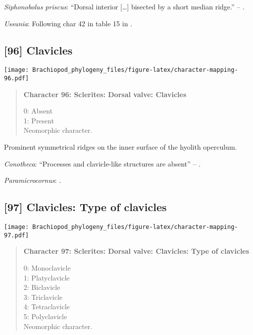 \documentclass[openany]{book}
\theoremstyle{definition}
\theoremstyle{definition}
\theoremstyle{definition}
\theoremstyle{remark}
\begin{document}
\hypertarget{Siphonobolus_priscus-coding-95}{}
\emph{Siphonobolus priscus}: ``Dorsal interior {[}\ldots{}{]} bisected
by a short median ridge.'' -- \citet{Popov2009Earlyontogeny}.

\hypertarget{Ussunia-coding-95}{}
\emph{Ussunia}: Following char 42 in table 15 in
\citet{Williams2000LinguliformeaCraniiformea}.

\subsection*{{[}96{]} Clavicles}\label{clavicles}

\texttt{[image: Brachiopod\_phylogeny\_files/figure-latex/character-mapping-96.pdf]}

\begin{quote}
\textbf{Character 96: Sclerites: Dorsal valve: Clavicles}

0: Absent\\
1: Present\\
Neomorphic character.
\end{quote}

Prominent symmetrical ridges on the inner surface of the hyolith
operculum.

\hypertarget{Conotheca-coding-96}{}
\emph{Conotheca}: ``Processes and clavicle-like structures are absent''
-- \citet{Davaere2014}.

\hypertarget{Paramicrocornus-coding-96}{}
\emph{Paramicrocornus}: \citet{Zhang2018Ahyolithid}.

\subsection*{{[}97{]} Clavicles: Type of
clavicles}\label{clavicles-type-of-clavicles}

\texttt{[image: Brachiopod\_phylogeny\_files/figure-latex/character-mapping-97.pdf]}

\begin{quote}
\textbf{Character 97: Sclerites: Dorsal valve: Clavicles: Type of
clavicles}

0: Monoclavicle\\
1: Platyclavicle\\
2: Biclavicle\\
3: Triclavicle\\
4: Tetraclavicle\\
5: Polyclavicle\\
Neomorphic character.
\end{quote}
\end{document}
